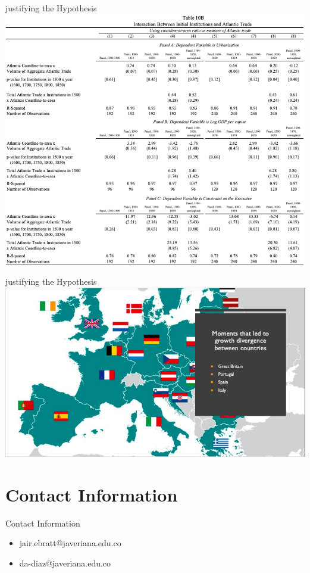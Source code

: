\documentclass[pdftex,12pt,xcolor=pdftex,table]{beamer}
\theoremstyle{definition}
\theoremstyle{remark}
\numberwithin{equation}{section}
\numberwithin{figure}{section}
\begin{document}
		\begin{frame}{justifying the Hypothesis}
			\justifying
		    \centering
		    \includegraphics[scale=0.37]{pp13.png}
		\end{frame}
		\begin{frame}{justifying the Hypothesis}
			\justifying
		    \centering
		    \includegraphics[scale=0.45]{pp16.png}
		\end{frame}

	\section{Contact Information}
		\begin{frame}{Contact Information}
			\justifying
			\begin{itemize}
			    \item jair.ebratt@javeriana.edu.co
			    \vspace{5mm} 
			    \item da-diaz@javeriana.edu.co
			\end{itemize}
		\end{frame}	
\end{document}
